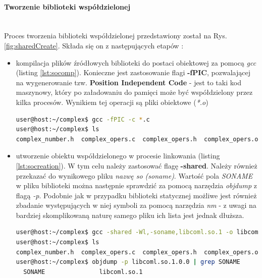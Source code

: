 \paragraph*{Tworzenie biblioteki współdzielonej}\mbox{}\\
Proces tworzenia biblioteki współdzielonej przedstawiony został na Rys. \ref{fig:sharedCreate}. Składa się on z następujących etapów \cite{Shared1}:
\begin{itemize}
\item kompilacja plików źródłowych biblioteki do postaci obiektowej za pomocą \textit{gcc} (listing \ref{lst:socomp}). Konieczne jest zastosowanie flagi \textbf{-fPIC}, pozwalającej na wygenerowanie tzw. \textbf{Position Independent Code} - jest to taki kod maszynowy, który po załadowaniu do pamięci może być współdzielony przez kilka procesów. Wynikiem tej operacji są pliki obiektowe (\textit{*.o})

\begin{lstlisting}[language=bash, style=Cmd, caption={Kompilacja plików źródłowych biblioteki (zastosowanie flagi -fPIC)}, label={lst:socomp}]
user@host:~/complex$ gcc -fPIC -c *.c
user@host:~/complex$ ls
complex_number.h  complex_opers.c  complex_opers.h  complex_opers.o
\end{lstlisting}

\item utworzenie obiektu współdzielonego w procesie linkowania (listing \ref{lst:socreation}). W tym celu należy zastosować flagę \textbf{-shared}. Należy również przekazać do wynikowego pliku \textit{nazwę so (soname)}. Wartość pola \textit{SONAME} w pliku biblioteki można następnie sprawdzić za pomocą narzędzia \textit{objdump} z flagą \textit{-p}. Podobnie jak w przypadku biblioteki statycznej możliwe jest również zbadanie występujących w niej symboli za pomocą narzędzia \textit{nm} - z uwagi na bardziej skomplikowaną naturę samego pliku ich lista jest jednak dłuższa. 

\begin{lstlisting}[language=bash, style=Cmd, caption={Utworzenie biblioteki współdzielonej, zbadanie wartości pola \textit{SONAME} w utworzonym pliku}, label={lst:socreation}]
user@host:~/complex$ gcc -shared -Wl,-soname,libcoml.so.1 -o libcoml.so.1.0.0 *.o
user@host:~/complex$ ls
complex_number.h  complex_opers.c  complex_opers.h  complex_opers.o  libcoml.so.1.0.0
user@host:~/complex$ objdump -p libcoml.so.1.0.0 | grep SONAME
  SONAME               libcoml.so.1
\end{lstlisting}


\end{itemize}
